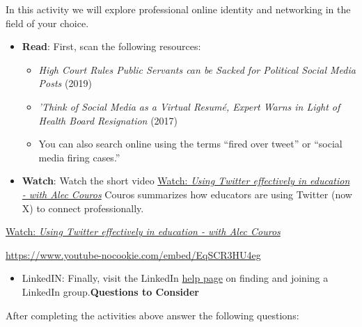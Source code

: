 \documentclass[
  letterpaper,
  DIV=11,
  numbers=noendperiod]{scrreprt}
\providecommand{\tightlist}{%
  \setlength{\itemsep}{0pt}\setlength{\parskip}{0pt}}\usepackage{longtable,booktabs,array}
\begin{document}
\begin{tcolorbox}[enhanced jigsaw, toprule=.15mm, colback=white, colframe=quarto-callout-note-color-frame, bottomtitle=1mm, leftrule=.75mm, coltitle=black, titlerule=0mm, rightrule=.15mm, colbacktitle=quarto-callout-note-color!10!white, left=2mm, title={Learning Activity}, opacitybacktitle=0.6, opacityback=0, breakable, toptitle=1mm, arc=.35mm, bottomrule=.15mm]

In this activity we will explore professional online identity and
networking in the field of your choice.

\begin{itemize}
\tightlist
\item
  \textbf{Read}: First, scan the following resources:

  \begin{itemize}
  \tightlist
  \item
    \emph{High Court Rules Public Servants can be Sacked for Political
    Social Media Posts} (2019)
  \item
    \emph{'Think of Social Media as a Virtual Resumé, Expert Warns in
    Light of Health Board Resignation} (2017)
  \item
    You can also search online using the terms ``fired over tweet'' or
    ``social media firing cases.''
  \end{itemize}
\item
  \textbf{Watch}: Watch the short video
  \href{https://www.youtube.com/watch?v=EqSCR3HU4eg}{Watch: \emph{Using
  Twitter effectively in education - with Alec Couros}} Couros
  summarizes how educators are using Twitter (now X) to connect
  professionally.
\end{itemize}

\href{https://www.youtube.com/watch?v=EqSCR3HU4eg}{Watch: \emph{Using
Twitter effectively in education - with Alec Couros}}

\url{https://www.youtube-nocookie.com/embed/EqSCR3HU4eg}

\begin{itemize}
\tightlist
\item
  LinkedIN: Finally, visit the LinkedIn
  \href{https://www.linkedin.com/help/linkedin/answer/a544795}{help
  page} on finding and joining a LinkedIn group.\textbf{Questions to
  Consider}
\end{itemize}

After completing the activities above answer the following questions:


\end{tcolorbox}
\end{document}
